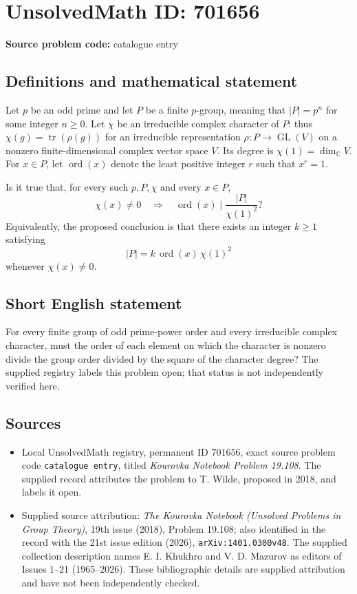 \documentclass[11pt]{article}
\newcommand{\C}{\mathbb{C}}
\begin{document}
\section*{UnsolvedMath ID: 701656}
\textbf{Source problem code:} catalogue entry
\subsection{Definitions and mathematical statement}
Let \(p\) be an odd prime and let \(P\) be a finite \(p\)-group, meaning that \(|P|=p^n\) for some integer \(n\geq 0\). Let \(\chi\) be an irreducible complex character of \(P\): thus \(\chi(g)=\operatorname{tr}(\rho(g))\) for an irreducible representation \(\rho:P\to\operatorname{GL}(V)\) on a nonzero finite-dimensional complex vector space \(V\). Its degree is \(\chi(1)=\dim_{\C}V\). For \(x\in P\), let \(\operatorname{ord}(x)\) denote the least positive integer \(r\) such that \(x^r=1\).

Is it true that, for every such \(p,P,\chi\) and every \(x\in P\),
\[
\chi(x)\neq 0\quad\Longrightarrow\quad
\operatorname{ord}(x)\mid\frac{|P|}{\chi(1)^2}?
\]
Equivalently, the proposed conclusion is that there exists an integer \(k\geq 1\) satisfying
\[
|P|=k\,\operatorname{ord}(x)\,\chi(1)^2
\]
whenever \(\chi(x)\neq 0\).
\subsection{Short English statement}
For every finite group of odd prime-power order and every irreducible complex character, must the order of each element on which the character is nonzero divide the group order divided by the square of the character degree? The supplied registry labels this problem open; that status is not independently verified here.
\subsection{Sources}
\begin{itemize}
\item Local UnsolvedMath registry, permanent ID \(701656\), exact source problem code \texttt{catalogue entry}, titled \emph{Kourovka Notebook Problem 19.108}. The supplied record attributes the problem to T. Wilde, proposed in 2018, and labels it open.
\item Supplied source attribution: \emph{The Kourovka Notebook (Unsolved Problems in Group Theory)}, 19th issue (2018), Problem 19.108; also identified in the record with the 21st issue edition (2026), \texttt{arXiv:1401.0300v48}. The supplied collection description names E. I. Khukhro and V. D. Mazurov as editors of Issues 1--21 (1965--2026). These bibliographic details are supplied attribution and have not been independently checked.
\end{itemize}
\end{document}
